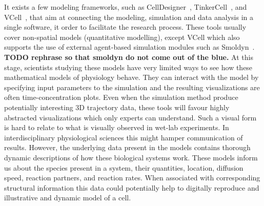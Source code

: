 It exists a few modeling frameworks, such as CellDesigner~\cite{funahashi2003celldesigner}, TinkerCell~\cite{chandran2009tinkercell}, and VCell~\cite{moraru2008virtual}, that aim at connecting the modeling, simulation and data analysis in a single software, it order to facilitate the research process.
These tools usually cover non-spatial models (quantitative modelling), except VCell which also supports the use of external agent-based simulation modules such as Smoldyn~\cite{andrews2010detailed}.
\textbf{TODO rephrase so that smoldyn do not come out of the blue.}
At this stage, scientists studying these models have very limited ways to see how these mathematical models of physiology behave.
They can interact with the model by specifying input parameters to the simulation and the resulting visualizations are often time-concentration plots.
Even when the simulation method produce potentially interesting 3D trajectory data, these tools will favour highly abstracted visualizations which only experts can understand.
Such a visual form is hard to relate to what is visually observed in wet-lab experiments. 
In interdisciplinary physiological sciences this might hamper communication of results. 
However, the underlying data present in the models contains thorough dynamic descriptions of how these biological systems work.
These models inform us about the species present in a system, their quantities, location, diffusion speed, reaction partners, and reaction rates.
When associated with corresponding structural information this data could potentially help to digitally reproduce and illustrative and dynamic model of a cell.

